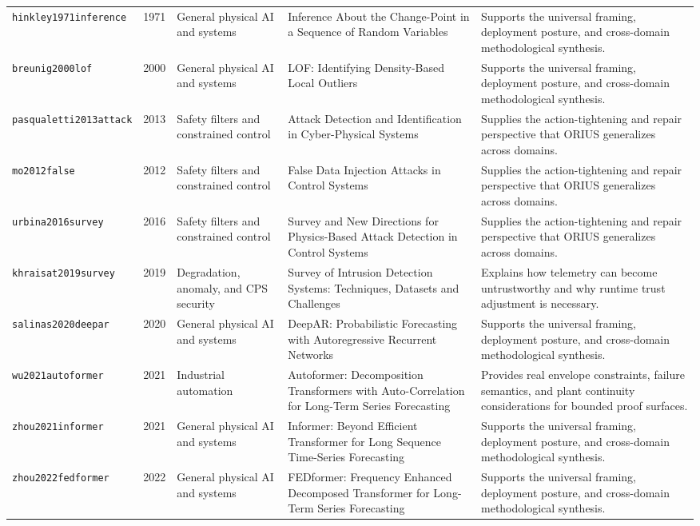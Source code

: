 \begin{longtable}{p{}p{}p{}p{}p{}}
\texttt{hinkley1971inference} & 1971 & General physical AI and systems & Inference About the Change-Point in a Sequence of Random Variables & Supports the universal framing, deployment posture, and cross-domain methodological synthesis.\\
\texttt{breunig2000lof} & 2000 & General physical AI and systems & LOF: Identifying Density-Based Local Outliers & Supports the universal framing, deployment posture, and cross-domain methodological synthesis.\\
\texttt{pasqualetti2013attack} & 2013 & Safety filters and constrained control & Attack Detection and Identification in Cyber-Physical Systems & Supplies the action-tightening and repair perspective that ORIUS generalizes across domains.\\
\texttt{mo2012false} & 2012 & Safety filters and constrained control & False Data Injection Attacks in Control Systems & Supplies the action-tightening and repair perspective that ORIUS generalizes across domains.\\
\texttt{urbina2016survey} & 2016 & Safety filters and constrained control & Survey and New Directions for Physics-Based Attack Detection in Control Systems & Supplies the action-tightening and repair perspective that ORIUS generalizes across domains.\\
\texttt{khraisat2019survey} & 2019 & Degradation, anomaly, and CPS security & Survey of Intrusion Detection Systems: Techniques, Datasets and Challenges & Explains how telemetry can become untrustworthy and why runtime trust adjustment is necessary.\\
\texttt{salinas2020deepar} & 2020 & General physical AI and systems & DeepAR: Probabilistic Forecasting with Autoregressive Recurrent Networks & Supports the universal framing, deployment posture, and cross-domain methodological synthesis.\\
\texttt{wu2021autoformer} & 2021 & Industrial automation & Autoformer: Decomposition Transformers with Auto-Correlation for Long-Term Series Forecasting & Provides real envelope constraints, failure semantics, and plant continuity considerations for bounded proof surfaces.\\
\texttt{zhou2021informer} & 2021 & General physical AI and systems & Informer: Beyond Efficient Transformer for Long Sequence Time-Series Forecasting & Supports the universal framing, deployment posture, and cross-domain methodological synthesis.\\
\texttt{zhou2022fedformer} & 2022 & General physical AI and systems & FEDformer: Frequency Enhanced Decomposed Transformer for Long-Term Series Forecasting & Supports the universal framing, deployment posture, and cross-domain methodological synthesis.\\

\end{longtable}
